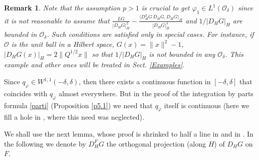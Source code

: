 \documentclass[reqno,twoside,12pt]{amsart}
\newtheorem{Remark}[Theorem]{Remark}
\begin{document}
\begin{Remark}
{\em Note that the assumption $p>1$ is crucial to get  $\varphi_1  \in L^1({\mathcal O}_{\delta})$ since it is not reasonable to assume that  $ \frac{LG }{|D_HG |_H^2}  - \frac{\langle  D^2_HG \,D_HG, D_HG\rangle_H}{ |D_HG |_H^4}$ and $1/|D_HG |_H$ are bounded in ${\mathcal O}_{\delta}$. Such conditions are  satisfied only in special cases. For instance, if ${\mathcal O}$ is the unit ball in a Hilbert space, $G(x) = \|x\|^2 -1$, $|D_HG(x)|_H = 2\|Q^{1/2}x\|$ so that $1/|D_HG |_H$ is not bounded in any ${\mathcal O}_{\delta}$. This example and other ones will be  treated in 
 Sect. \ref{Examples}. }
\end{Remark}

Since  $q_{\varphi}\in W^{1,1}(-\delta, \delta)$, then there exists a continuous function in $[-\delta, \delta]$ that coincides with  $q_{\varphi}$ almost everywhere. But in the proof of the integration by parts formula \eqref{parti} (Proposition \ref{p5.1}) we need that $q_{\varphi}$ itself is continuous (here we fill a hole in  \cite{BDPT1,BDPT2,DPL}, where this need was neglected).  
 
We shall use the next lemma, whose proof is shrinked  to half a line in \cite{Feyel} and in \cite{FP}. 
In the following we denote by  $D_H^FG$  the orthogonal projection (along $H$) of $D_HG$ on $F$. 
\end{document}
